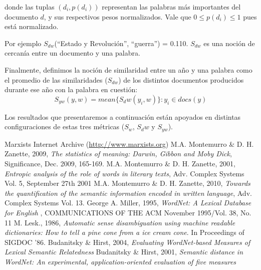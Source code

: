 \documentclass{pnastwo}
\begin{document}
\begin{article}
donde las tuplas $(d_i , p(d_i))$ representan las palabras más importantes del documento $d$, y sus respectivos pesos normalizados. Vale que $0 \leq p(d_i) \leq 1$ pues está normalizado.

Por ejemplo $S_{dw}$(“Estado y Revolución”, “guerra”) = 0.110. $S_{dw}$ es una noción de cercanía entre un documento y una palabra.

Finalmente, definimos la noción de similaridad entre un año y una palabra como el promedio de las similaridades ($S_{dw}$) 
de los distintos documentos producidos durante ese año con la palabra en cuestión:
\begin{equation}
  S_{yw}(y, w) = mean \{ S_dw(y_i, w) \} : y_i \in docs(y) 
\end{equation}

Los resultados que presentaremos a continuaci\'on est\'an apoyados en distintas configuraciones de estas tres m\'etricas ($S_w$, $S_dw$ y $S_{yw}$).

% 



\begin{thebibliography}{10}
Marxists Internet Archive (\url{http://www.marxists.org})
M.A. Montemurro \& D. H. Zanette, 2009, {\em The statistics of meaning: Darwin, Gibbon and Moby Dick}, Significance, Dec. 2009, 165-169.
M.A. Montemurro \& D. H. Zanette, 2001, {\em Entropic analysis of the role of words in literary texts}, Adv. Complex Systems Vol. 5, September 27th 2001
M.A. Montemurro \& D. H. Zanette, 2010, {\em Towards the quantification of the semantic information encoded in written language}, Adv. Complex Systems Vol. 13.
George A. Miller, 1995, {\em WordNet: A Lexical Database for English }, COMMUNICATIONS OF THE ACM November 1995/Vol. 38, No. 11
M. Lesk., 1986, {\em Automatic sense disambiguation using machine readable dictionaries: How to tell a pine cone from a ice cream cone}. In Proceedings of SIGDOC ’86.
Budanitsky \& Hirst, 2004, {\em Evaluating WordNet-based Measures of Lexical Semantic Relatedness}
Budanitsky \& Hirst, 2001, {\em Semantic distance in WordNet: An experimental, application-oriented evaluation of five measures}
\end{thebibliography}
\end{article}
\end{document}
